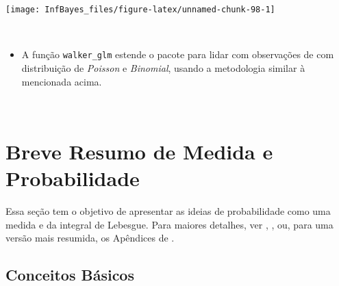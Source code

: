 \documentclass[
]{book}
\providecommand{\tightlist}{%
  \setlength{\itemsep}{0pt}\setlength{\parskip}{0pt}}
\begin{document}
\begin{center}\texttt{[image: InfBayes\_files/figure-latex/unnamed-chunk-98-1]} \end{center}

\(~\)

\begin{itemize}
\tightlist
\item
  A função \texttt{walker\_glm} estende o pacote para lidar com observações de com distribuição de \emph{Poisson} e \emph{Binomial}, usando a metodologia similar à mencionada acima.
\end{itemize}

\(~\)

\hypertarget{appendix-apuxeandice}{%
\appendix}


\hypertarget{medprob}{%
\chapter{Breve Resumo de Medida e Probabilidade}\label{medprob}}

Essa seção tem o objetivo de apresentar as ideias de probabilidade como uma medida e da integral de Lebesgue. Para maiores detalhes, ver \citet{Ash00}, \citet{Billingsley86}, \citet{Shiryaev96} ou, para uma versão mais resumida, os Apêndices de \citet{Schervish12}.

\hypertarget{basprob}{%
\section{Conceitos Básicos}\label{basprob}}
\end{document}
